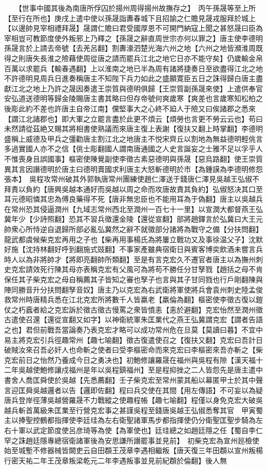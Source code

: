 　　【世事中國其後為南唐所俘囚於揚州周得揚州故撫存之】　丙午孫晟等至上所【至行在所也】庚戌上遣中使以孫晟詣夀春城下且招諭之仁贍見晟戎服拜於城上【以邊帥見宰相禮拜晟】晟謂仁贍曰君受國厚恩不可開門納寇上聞之甚怒晟曰臣為宰相豈可教節度使外叛邪上乃釋之【孫晟之辭直周世宗亦何以罪之】唐主使李德明孫晟言於上請去帝號【去羌呂翻】割夀濠泗楚光海六州之地【六州之地皆瀕淮周既得之則唐失長淮之險藉使周從唐之請而罷兵江北之地它日亦不能守矣】仍歲輸金帛百萬以求罷兵【輸春遇翻】上以淮南之地已半為周有諸將捷奏日至欲盡得江北之地不許德明見周兵日進奏稱唐主不知陛下兵力如此之盛願寛臣五日之誅得歸白唐主盡獻江北之地上乃許之晟因奏遣王崇質與德明俱歸【王崇質副孫晟來使】上遣供奉官安弘道送德明等歸金陵賜唐主書其略曰但存帝號何爽歲寒【爽差也言歲寒知松柏之後彫此約不差也許唐主自帝江南】儻堅事大之心終不廹人于險又曰俟諸郡之悉來【謂江北諸郡也】即大軍之立罷言盡於此更不煩云【煩勞也言更不勞云云也】苟曰未然請從茲絶又賜其將相書使熟議而來唐主復上表謝【復扶又翻上時掌翻】李德明盛稱上威德及甲兵之彊勸唐主割江北之地唐主不悦宋齊丘以割地為無益德明輕佻言多過實國人亦不之信【佻士彫翻國人謂南唐通國之人史言誕妄之士雅不足以孚乎人不惟喪身且誤國事】樞密使陳覺副使李徵古素惡德明與孫晟【惡烏路翻】使王崇質異其言因譖德明於唐主曰德明賣國求利唐主大怒斬德明於市【為鍾謨為李德明修怨張本】　吳程攻常州破其外郭執唐常州團練使趙仁澤送于錢唐仁澤見吳越王弘俶不拜責以負約【唐興吳越本通好而吳越以周之命而攻唐故責其負約】弘俶怒决其口至耳元德昭憐其忠為傅良藥得不死【唐非無忠臣也不能用耳為于偽翻】唐主以吳越兵在常州恐其侵逼潤州【九域志常州西北至潤州一百七十一里】以宣潤大都督燕王弘冀年少【少詩照翻】恐其不習兵徵還金陵【還從宣翻】部將趙鐸言於弘冀曰大王元帥衆心所恃逆自退歸所部必亂弘冀然之辭不就徵部分諸將為戰守之備【分扶問翻】龍武都虞候柴克宏再用之子也【柴再用事楊氏為將屢立戰功又及事徐温父子】沈默好施【沈持林翻好呼到翻施式豉翻】不事家產雖典宿衛日與賓客博奕飲酒未嘗言兵時人以為非將帥才【將即亮翻帥所類翻】至是有言克宏久不遷官者唐主以為撫州刺史克宏請效死行陳其母亦表稱克宏有父風可為將苟不勝任分甘孥戮【趙括之母不肯保任其子柴克宏之母自稱薦其子皆知之審也孥子也言與其子甘同戮也行戶剛翻陳與陣同勝音升分扶問翻孥音奴】唐主乃以克宏為右武衛將軍使將兵會袁州刺史陸孟俊救常州時唐精兵悉在江北克宏所將數千人皆羸老【羸倫為翻】樞密使李徵古復以鎧仗之朽蠧者給之克宏訴於徵古徵古慢罵之衆皆憤恚【恚於避翻】克宏怡然至潤州徵古遣使召還【還從宣翻又如字】以神衛統軍朱匡業代之燕王弘冀謂克宏【謂者告語之也】君但前戰吾當論奏乃表克宏才略可以成功常州危在旦莫【莫讀曰暮】不宜中易主將克宏引兵徑趣常州【趣七喻翻】徵古復遣使召之【復扶又翻】克宏曰吾計日破賊汝來召吾必奸人也命斬之使者曰受李樞密命而來克宏曰李樞密來吾亦斬之【柴克宏前日之怡然乃養成今日之勇决也】初鮑修讓羅晟在福州與吳程有隙【漢天福十二年吳越使鮑修讓戍福州是年以吳程鎮福州】至是程抑挫之二人皆怨先是唐主遣中書舍人喬匡舜使於吳越【先悉薦翻】壬子柴克宏至常州蒙其船以幕匿甲士於其中聲言迎匡舜吳越邏者以告【邏即佐翻】程曰兵交使在其間【用左傳語】不可妄以為疑唐兵登岸徑薄吳越營羅晟不力戰縱之使趣程帳【趣七喻翻】程僅以身免克宏大破吳越兵斬首萬級朱匡業至行營克宏事之甚謹吳程至錢唐吳越王弘俶悉奪其官　甲寅蜀主以捧聖控鶴都指揮使李廷珪為左右衛聖諸軍馬步都指揮使仍分衛聖匡聖步騎為左右十軍以武定節度使呂彦琦等為使【為軍使也】廷珪總之如趙廷隱之任【蜀自李仁罕之誅趙廷隱專總宿衛諸軍後為安思謙所譖罷事並見前】　初柴克宏為宣州廵檢使始至城塹不修器械皆闕吏云自田頵王茂章李遇相繼叛【唐天復三年田頵以宣州叛楊行密天祐二年王茂章叛梁乾元二年李遇叛事並見前紀頵於倫翻】後人無